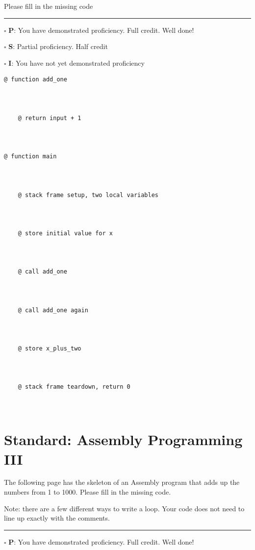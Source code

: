\documentclass[12pt]{article}
\begin{document}
Please fill in the missing code

\vfill

\rule[1ex]{\textwidth}{.1pt}

$\square$ \textbf{P}: You have demonstrated proficiency. Full credit. Well done!

$\square$ \textbf{S}: Partial proficiency. Half credit

$\square$ \textbf{I}: You have not yet demonstrated proficiency

\newpage

\begin{verbatim}
@ function add_one



    @ return input + 1



@ function main


    
    @ stack frame setup, two local variables



    @ store initial value for x



    @ call add_one



    @ call add_one again



    @ store x_plus_two



    @ stack frame teardown, return 0



\end{verbatim}



\section*{Standard: Assembly Programming III}

The following page has the skeleton of an Assembly program that adds up the numbers from 1 to 1000. Please fill in the missing code. 

Note: there are a few different ways to write a loop. Your code does not need to line up exactly with the comments.

\vfill

\rule[1ex]{\textwidth}{.1pt}

$\square$ \textbf{P}: You have demonstrated proficiency. Full credit. Well done!
\end{document}
